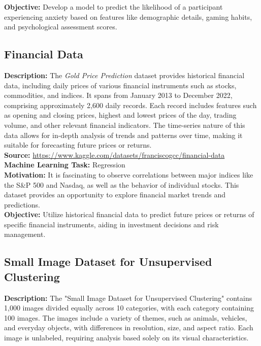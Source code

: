 \documentclass{article}
\begin{document}
\textbf{Objective:} Develop a model to predict the likelihood of a participant experiencing anxiety based on features like demographic details, gaming habits, and psychological assessment scores.

\subsection{Financial Data}
\textbf{Description:} 
The \textit{Gold Price Prediction} dataset provides historical financial data, including daily prices of various financial instruments such as stocks, commodities, and indices. It spans from January 2013 to December 2022, comprising approximately 2,600 daily records. Each record includes features such as opening and closing prices, highest and lowest prices of the day, trading volume, and other relevant financial indicators. The time-series nature of this data allows for in-depth analysis of trends and patterns over time, making it suitable for forecasting future prices or returns. \\

\textbf{Source:} \href{https://www.kaggle.com/datasets/franciscogcc/financial-data}{https://www.kaggle.com/datasets/franciscogcc/financial-data} \\

\textbf{Machine Learning Task:} Regression \\

\textbf{Motivation:} It is fascinating to observe correlations between major indices like the S&P 500 and Nasdaq, as well as the behavior of individual stocks. This dataset provides an opportunity to explore financial market trends and predictions. \\

\textbf{Objective:} Utilize historical financial data to predict future prices or returns of specific financial instruments, aiding in investment decisions and risk management. \\

\subsection{Small Image Dataset for Unsupervised Clustering}
\textbf{Description:} 
The "Small Image Dataset for Unsupervised Clustering" contains 1,000 images divided equally across 10 categories, with each category containing 100 images. The images include a variety of themes, such as animals, vehicles, and everyday objects, with differences in resolution, size, and aspect ratio. Each image is unlabeled, requiring analysis based solely on its visual characteristics.\\
\end{document}

